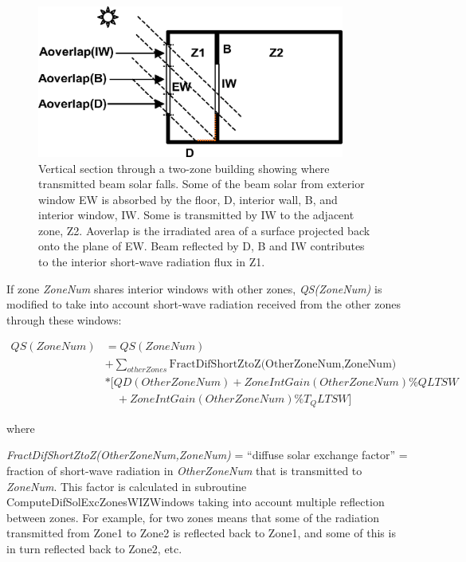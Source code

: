 \begin{figure}[hbtp] %
\centering
\includegraphics[width=0.9\textwidth, height=0.9\textheight, keepaspectratio=true]{media/image656.png}
\caption{Vertical section through a two-zone building showing where transmitted beam solar falls. Some of the beam solar from exterior window EW is absorbed by the floor, D, interior wall, B, and interior window, IW. Some is transmitted by IW to the adjacent zone, Z2. Aoverlap is the irradiated area of a surface projected back onto the plane of EW. Beam reflected by D, B and IW contributes to the interior short-wave radiation flux in Z1. \protect \label{fig:vertical-section-through-a-two-zone-building}}
\end{figure}

If zone \emph{ZoneNum} shares interior windows with other zones, \emph{QS(ZoneNum)} is modified to take into account short-wave radiation received from the other zones through these windows:

\begin{equation}
\begin{array}{rl}
   QS(ZoneNum) & = QS(ZoneNum) \\
               &+ \sum_{otherZones}\text{FractDifShortZtoZ(OtherZoneNum,ZoneNum)} \\
               &* [QD(OtherZoneNum) + ZoneIntGain(OtherZoneNum)\% QLTSW \\
               &\quad + ZoneIntGain(OtherZoneNum)\% T_QLTSW]
  \end{array}
\end{equation}

where

\emph{FractDifShortZtoZ(OtherZoneNum,ZoneNum)} = ``diffuse solar exchange factor'' = fraction of short-wave radiation in \emph{OtherZoneNum} that is transmitted to \emph{ZoneNum}. This factor is calculated in subroutine ComputeDifSolExcZonesWIZWindows taking into account multiple reflection between zones. For example, for two zones means that some of the radiation transmitted from Zone1 to Zone2 is reflected back to Zone1, and some of this is in turn reflected back to Zone2, etc.

